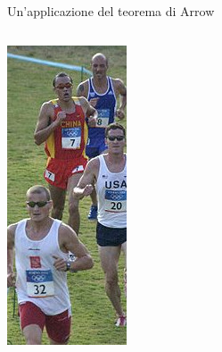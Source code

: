 \documentclass[11pt]{beamer}
\begin{document}
\begin{frame}{Un'applicazione del teorema di Arrow}
\begin{columns}
\begin{column}{.2\columnwidth}
\begin{center}
\includegraphics[width=\textwidth]{./figure/Pentathlon.jpg}
\end{center}
\end{column}
\end{columns}
\end{frame}
\end{document}
